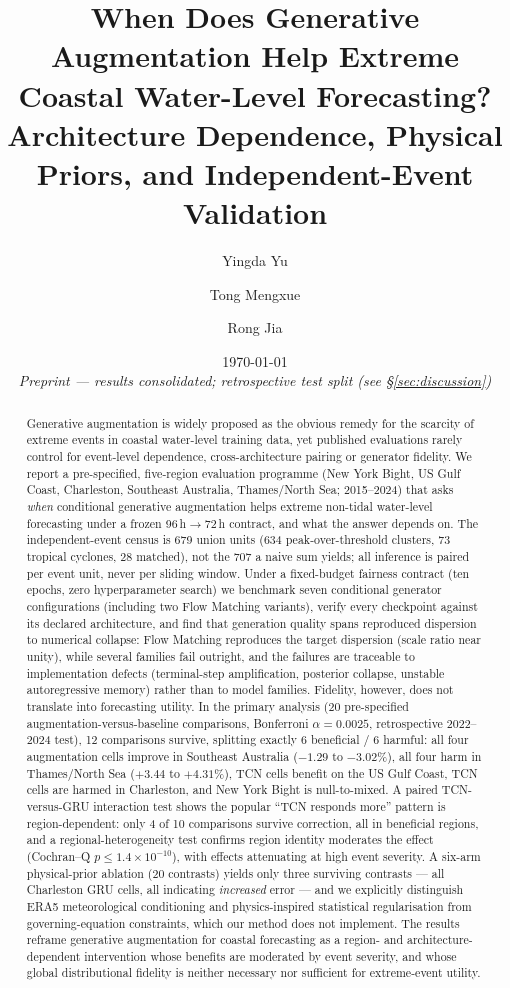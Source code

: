 \documentclass[11pt]{article}
\title{\textbf{When Does Generative Augmentation Help Extreme Coastal
Water-Level Forecasting?\\ Architecture Dependence, Physical Priors, and
Independent-Event Validation}}
\author{Yingda Yu \and Tong Mengxue \and Rong Jia}
\date{\today\\\textit{Preprint --- results consolidated; retrospective test split (see \S\ref{sec:discussion})}}
\begin{document}
\maketitle

\begin{abstract}
Generative augmentation is widely proposed as the obvious remedy for the
scarcity of extreme events in coastal water-level training data, yet published
evaluations rarely control for event-level dependence, cross-architecture
pairing or generator fidelity. We report a pre-specified, five-region
evaluation programme (New York Bight, US Gulf Coast, Charleston, Southeast
Australia, Thames/North Sea; 2015--2024) that asks \emph{when} conditional
generative augmentation helps extreme non-tidal water-level forecasting under
a frozen 96\,h$\rightarrow$72\,h contract, and what the answer depends on.
The independent-event census is 679 union units (634 peak-over-threshold
clusters, 73 tropical cyclones, 28 matched), not the 707 a naive sum yields;
all inference is paired per event unit, never per sliding window. Under a
fixed-budget fairness contract (ten epochs, zero hyperparameter search) we
benchmark seven conditional generator configurations (including two Flow
Matching variants), verify every checkpoint
against its declared architecture, and find that generation quality spans
reproduced dispersion to numerical collapse: Flow Matching reproduces the
target dispersion (scale ratio near unity), while several families fail
 outright, and the failures are traceable to implementation defects
(terminal-step amplification, posterior collapse, unstable autoregressive
memory) rather than to model families. Fidelity, however, does not translate
into forecasting utility. In the primary analysis (20 pre-specified
augmentation-versus-baseline comparisons, Bonferroni $\alpha=0.0025$,
retrospective 2022--2024 test), 12 comparisons survive, splitting exactly 6
beneficial / 6 harmful: all four augmentation cells improve in Southeast
Australia ($-1.29$ to $-3.02\%$), all four harm in Thames/North Sea
($+3.44$ to $+4.31\%$), TCN cells benefit on the US Gulf Coast, TCN cells are
harmed in Charleston, and New York Bight is null-to-mixed. A paired
TCN-versus-GRU interaction test shows the popular ``TCN responds more''
pattern is region-dependent: only 4 of 10 comparisons survive correction, all
in beneficial regions, and a regional-heterogeneity test confirms region
identity moderates the effect (Cochran--Q $p \le 1.4\times10^{-10}$), with
effects attenuating at high event severity. A six-arm physical-prior ablation
(20 contrasts) yields only three surviving contrasts --- all Charleston GRU
cells, all indicating \emph{increased} error --- and we explicitly
distinguish ERA5 meteorological conditioning and physics-inspired statistical
regularisation from governing-equation constraints, which our method does not
implement. The results reframe generative augmentation for coastal forecasting
as a region- and architecture-dependent intervention whose benefits are
moderated by event severity, and whose global distributional fidelity is
neither necessary nor sufficient for extreme-event utility.
\end{abstract}
\end{document}
